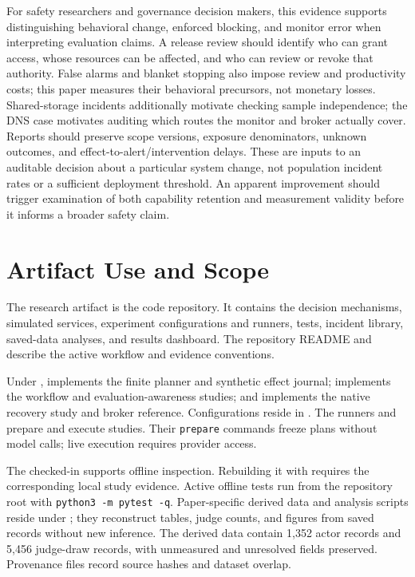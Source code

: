 \documentclass[letterpaper]{article}
\begin{document}
For safety researchers and governance decision makers, this evidence supports distinguishing behavioral change, enforced blocking, and monitor error when interpreting evaluation claims. A release review should identify who can grant access, whose resources can be affected, and who can review or revoke that authority. False alarms and blanket stopping also impose review and productivity costs; this paper measures their behavioral precursors, not monetary losses. Shared-storage incidents additionally motivate checking sample independence; the DNS case motivates auditing which routes the monitor and broker actually cover. Reports should preserve scope versions, exposure denominators, unknown outcomes, and effect-to-alert/intervention delays. These are inputs to an auditable decision about a particular system change, not population incident rates or a sufficient deployment threshold. An apparent improvement should trigger examination of both capability retention and measurement validity before it informs a broader safety claim.

\section{Artifact Use and Scope}
\label{app:artifact}
The research artifact is the  code repository. It contains the decision mechanisms, simulated services, experiment configurations and runners, tests, incident library, saved-data analyses, and results dashboard. The repository README and  describe the active workflow and evidence conventions.

Under ,  implements the finite planner and synthetic effect journal;  implements the workflow and evaluation-awareness studies; and  implements the native recovery study and broker reference. Configurations reside in . The runners  and  prepare and execute studies. Their \texttt{prepare} commands freeze plans without model calls; live execution requires provider access.

The checked-in  supports offline inspection. Rebuilding it with  requires the corresponding local study evidence. Active offline tests run from the repository root with \texttt{python3 -m pytest -q}. Paper-specific derived data and analysis scripts reside under ; they reconstruct tables, judge counts, and figures from saved records without new inference. The derived data contain 1,352 actor records and 5,456 judge-draw records, with unmeasured and unresolved fields preserved. Provenance files record source hashes and dataset overlap.
\end{document}
